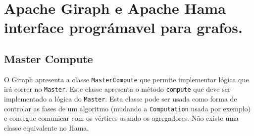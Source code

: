 \chapter{Apache Giraph e Apache Hama interface prográmavel para grafos.}

\section{Master Compute}

O Giraph apresenta a classe \texttt{MasterCompute} que permite implementar lógica que irá correr no \texttt{Master}. Este classe apresenta o método \texttt{compute} que deve ser implementado a lógica do \texttt{Master}. Esta classe pode ser usada como forma de controlar as fases de um algoritmo (mudando a \texttt{Computation} usada por exemplo) e consegue comunicar com os vértices usando os agregadores. Não existe uma classe equivalente no Hama.












